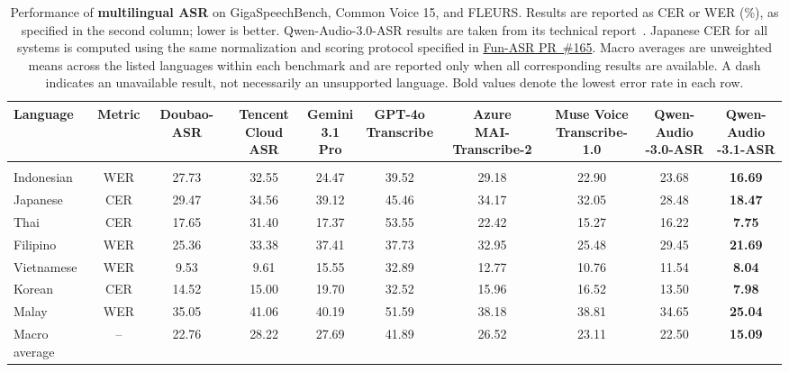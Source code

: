 \documentclass{article}
\begin{document}
\begin{table}[t]
\centering
\caption{Performance of \textbf{multilingual ASR} on GigaSpeechBench, Common Voice 15, and FLEURS. Results are reported as CER or WER (\%), as specified in the second column; lower is better. Qwen-Audio-3.0-ASR results are taken from its technical report~\citep{qwen_audio_3_0_asr}. Japanese CER for all systems is computed using the same normalization and scoring protocol specified in \href{https://github.com/QwenAudio/Fun-ASR/pull/165}{Fun-ASR PR~\#165}. Macro averages are unweighted means across the listed languages within each benchmark and are reported only when all corresponding results are available. A dash indicates an unavailable result, not necessarily an unsupported language. Bold values denote the lowest error rate in each row.}
\label{tab:multilingual}
\begingroup
\scriptsize
\setlength{\tabcolsep}{4pt}
\renewcommand{\arraystretch}{1.13}
\begin{adjustbox}{max width=\textwidth}
\begin{tabular}{lccccccccc}
\toprule
Language & Metric & Doubao-ASR & \shortstack{Tencent\\Cloud ASR} & \shortstack{Gemini\\3.1 Pro} & \shortstack{GPT-4o\\Transcribe} & \shortstack{Azure\\MAI-Transcribe-2} & \shortstack{Muse Voice\\Transcribe-1.0} & \shortstack{Qwen-Audio\\-3.0-ASR} & \shortstack{Qwen-Audio\\-3.1-ASR} \\
\midrule

\rowcolor{QwenPurpleLight}
\multicolumn{10}{c}{\color{QwenPurple}\bfseries GigaSpeechBench} \\
Indonesian & WER & 27.73 & 32.55 & 24.47 & 39.52 & 29.18 & 22.90 & 23.68 & \textbf{16.69} \\
Japanese & CER & 29.47 & 34.56 & 39.12 & 45.46 & 34.17 & 32.05 & 28.48 & \textbf{18.47} \\
Thai & CER & 17.65 & 31.40 & 17.37 & 53.55 & 22.42 & 15.27 & 16.22 & \textbf{7.75} \\
Filipino & WER & 25.36 & 33.38 & 37.41 & 37.73 & 32.95 & 25.48 & 29.45 & \textbf{21.69} \\
Vietnamese & WER & 9.53 & 9.61 & 15.55 & 32.89 & 12.77 & 10.76 & 11.54 & \textbf{8.04} \\
Korean & CER & 14.52 & 15.00 & 19.70 & 32.52 & 15.96 & 16.52 & 13.50 & \textbf{7.98} \\
Malay & WER & 35.05 & 41.06 & 40.19 & 51.59 & 38.18 & 38.81 & 34.65 & \textbf{25.04} \\
\cmidrule(lr){1-10}
Macro average & -- & 22.76 & 28.22 & 27.69 & 41.89 & 26.52 & 23.11 & 22.50 & \textbf{15.09} \\
\midrule


\end{tabular}
\end{adjustbox}
\end{table}
\end{document}
